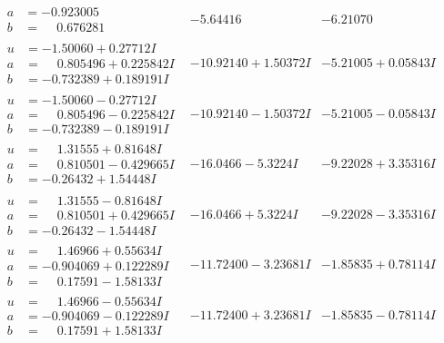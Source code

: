 \documentclass[1p]{elsarticle_modified}
\theoremstyle{definition}
\begin{document}
$$\begin{array}{c|c|c}
\begin{aligned}
a &= -0.923005\phantom{ +0.000000I} \\
b &= \phantom{-}0.676281\phantom{ +0.000000I}\end{aligned}
 & -5.64416\phantom{ +0.000000I} & -6.21070\phantom{ +0.000000I} \\ \hline\begin{aligned}
u &= -1.50060 + 0.27712 I \\
a &= \phantom{-}0.805496 + 0.225842 I \\
b &= -0.732389 + 0.189191 I\end{aligned}
 & -10.92140 + 1.50372 I & -5.21005 + 0.05843 I \\ \hline\begin{aligned}
u &= -1.50060 - 0.27712 I \\
a &= \phantom{-}0.805496 - 0.225842 I \\
b &= -0.732389 - 0.189191 I\end{aligned}
 & -10.92140 - 1.50372 I & -5.21005 - 0.05843 I \\ \hline\begin{aligned}
u &= \phantom{-}1.31555 + 0.81648 I \\
a &= \phantom{-}0.810501 - 0.429665 I \\
b &= -0.26432 + 1.54448 I\end{aligned}
 & -16.0466 - 5.3224 I & -9.22028 + 3.35316 I \\ \hline\begin{aligned}
u &= \phantom{-}1.31555 - 0.81648 I \\
a &= \phantom{-}0.810501 + 0.429665 I \\
b &= -0.26432 - 1.54448 I\end{aligned}
 & -16.0466 + 5.3224 I & -9.22028 - 3.35316 I \\ \hline\begin{aligned}
u &= \phantom{-}1.46966 + 0.55634 I \\
a &= -0.904069 + 0.122289 I \\
b &= \phantom{-}0.17591 - 1.58133 I\end{aligned}
 & -11.72400 - 3.23681 I & -1.85835 + 0.78114 I \\ \hline\begin{aligned}
u &= \phantom{-}1.46966 - 0.55634 I \\
a &= -0.904069 - 0.122289 I \\
b &= \phantom{-}0.17591 + 1.58133 I\end{aligned}
 & -11.72400 + 3.23681 I & -1.85835 - 0.78114 I \\ \hline\begin{aligned}

\end{aligned}
\end{array}$$
\end{document}
